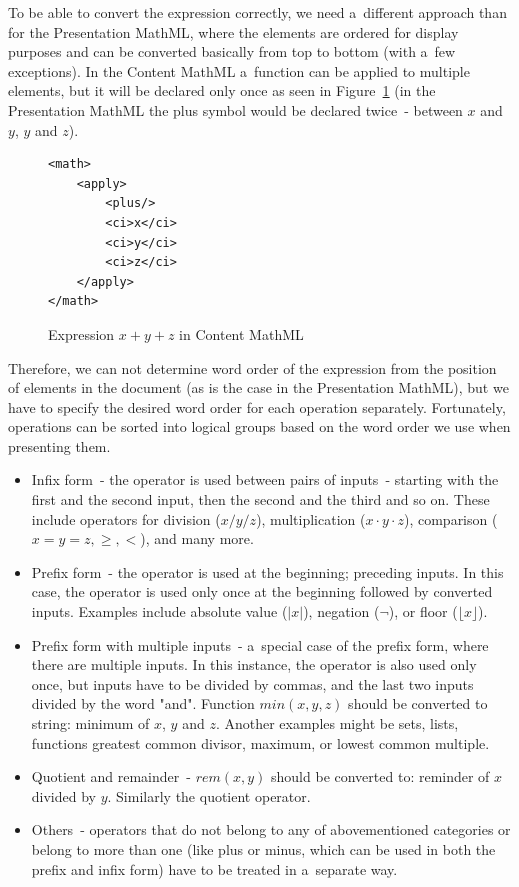 \documentclass[11pt,oneside,final]{fithesis2}
\begin{document}
To be able to convert the expression correctly, we need a~different approach than for the Presentation MathML, where the elements are ordered for display purposes and can be converted basically from top to bottom (with a~few exceptions). In the Content MathML a~function can be applied to multiple elements, but it will be declared only once as seen in Figure~\ref{fig:mathplus} (in the Presentation MathML the plus symbol would be declared twice~- between $x$ and $y$, $y$ and $z$).

\begin{figure}[!ht]
\lstset{language=XML,frame=lines}
\begin{lstlisting}
<math>
	<apply>
		<plus/>
		<ci>x</ci>
		<ci>y</ci>
		<ci>z</ci>
	</apply>
</math>
\end{lstlisting}
\caption{Expression $x+y+z$ in Content MathML}
\label{fig:mathplus}
\end{figure}

Therefore, we can not determine word order of the expression from the position of elements in the document (as is the case in the Presentation MathML), but we have to specify the desired word order for each operation separately. Fortunately, operations can be sorted into logical groups based on the word order we use when presenting them.

\begin{itemize}
\item Infix form~- the operator is used between pairs of inputs~- starting with the first and the second input, then the second and the third and so on. These include operators for division ($x/y/z$), multiplication ($x\cdot y\cdot z$), comparison ($x=y=z, \geq, <$), and many more.

\item  Prefix form~- the operator is used at the beginning; preceding inputs. In this case, the operator is used only once at the beginning followed by converted inputs. Examples include absolute value ($|x|$), negation ($\neg$), or floor ($\lfloor x \rfloor$).

\item Prefix form with multiple inputs~- a~special case of the prefix form, where there are multiple inputs. In this instance, the operator is also used only once, but inputs have to be divided by commas, and the last two inputs divided by the word "and". Function $min(x,y,z)$ should be converted to string: minimum of $x$, $y$ and $z$. Another examples might be sets, lists, functions greatest common divisor, maximum, or lowest common multiple.

\item Quotient and remainder~- $rem(x,y)$ should be converted to: reminder of $x$ divided by $y$. Similarly the quotient operator.

\item Others~- operators that do not belong to any of abovementioned categories or belong to more than one (like plus or minus, which can be used in both the prefix and infix form) have to be treated in a~separate way.
\end{itemize}
\end{document}
